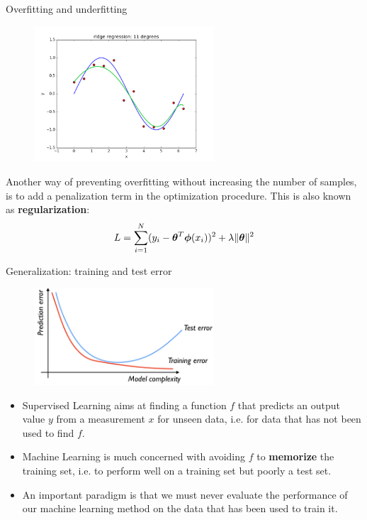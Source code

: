 \documentclass[xcolor=pdftex,dvipsnames,table]{beamer}
\begin{document}
\begin{frame}{Overfitting and underfitting}
\begin{figure}[htb]
\includegraphics[width=0.6\textwidth]{../graphics/ridge_regression_11_10.png}
\end{figure}
Another way of preventing overfitting without increasing the number of samples, is to add a penalization term in the optimization procedure. This is also known as \textbf{regularization}:
\begin{equation}
	L = \sum_{i=1}^N (y_i - \boldsymbol{\theta}^T \boldsymbol{\phi} (x_i))^2 + \lambda \| \boldsymbol{\theta} \|^2
\end{equation}
\end{frame}

\begin{frame}{Generalization: training and test error}
\begin{figure}[htb]
\includegraphics[width=0.6\textwidth]{../graphics/Training_and_test_error.png}
\end{figure}
\begin{itemize}
\item Supervised Learning aims at finding a function $f$ that predicts an output value $y$ from a measurement $x$ for unseen data, i.e. for data that has not been used to find $f$.
\item Machine Learning is much concerned with avoiding $f$ to \textbf{memorize} the training set, i.e. to perform well on a training set but poorly a test set.
\item An important paradigm is that we must never evaluate the performance of our machine learning method on the data that has been used to train it.
\end{itemize}
\end{frame}
\end{document}
